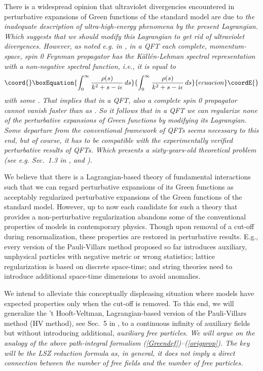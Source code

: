 \documentclass[a4paper,12pt]{article}
\providecommand{\prop}{\widetilde{\Delta}}
\providecommand{\propF}{\prop_F}
\begin{document}
There is a widespread opinion that ultraviolet divergencies encountered in perturbative expansions of Green functions of the standard model are due to \it the inadequate description of ultra-high-energy phenomena by the present Lagrangian. \rm Which suggests that we should modify this Lagrangian to get rid of ultraviolet divergences. However, as noted e.g. in \cite{Weinberg}, in a QFT each complete, momentum-space, spin 0 Feynman propagator has the K\"all\'en-Lehman spectral representation with a non-negative spectral function, i.e., it is equal to
\begin{equation}\coord{}\boxEquation{
   \int_0^\infty {\rho(s)\over k^2 + s - i\epsilon}\, ds
   \label{Kahlenrep}
}{
   \int_0^\infty {\rho(s)\over k^2 + s - i\epsilon}\, ds
   }{ecuacion}\coordE{}\end{equation}
with some \coordHE{}. That implies that in a QFT, also a complete spin 0 propagator cannot vanish faster than \myHighlight{$\propF(k)$}\coordHE{} as \coordHE{}. So it follows that in a QFT we can regularize none of the perturbative expansions of Green functions by modifying its Lagrangian. \it Some departure from the conventional framework of QFTs seems necessary to this end, but of course, it has to be compatible with the experimentally verified perturbative results of QFTs. \rm Which presents a sixty-years-old theoretical problem (see e.g. Sec.~1.3 in \cite{Weinberg}, and \cite{Villars}).

We believe that there is a Lagrangian-based theory of fundamental interactions such that we can regard perturbative expansions of its Green functions as acceptably regularized perturbative expansions of the Green functions of the standard model. However, up to now each candidate for such a theory that provides a non-perturbative regularization abandons some of the conventional properties of models in contemporary physics. Though upon removal of a cut-off during renormalization, these properties are restored in perturbative results. E.g., every version of the Pauli-Villars method proposed so far introduces auxiliary, unphysical particles with negative metric or wrong statistics; lattice regularization is based on discrete space-time; and string theories need to introduce additional space-time dimensions to avoid anomalies.

We intend to alleviate this conceptually displeasing situation where models have expected properties only when the cut-off is removed. To this end, we will generalize the 't Hooft-Veltman, Lagrangian-based version of the Pauli-Villars method (HV method), see Sec.~5 in \cite{Hooft}, to a continuous infinity of auxiliary fields but without introducing additional, \it auxiliary free particles. \rm We will \it argue \rm on the analogy of the above path-integral formalism (\ref{Greendef})--(\ref{origprop}). The key will be the LSZ reduction formula as, in general, \it it does not imply a direct connection between the number of free fields and the number of free particles. \rm 
\end{document}
